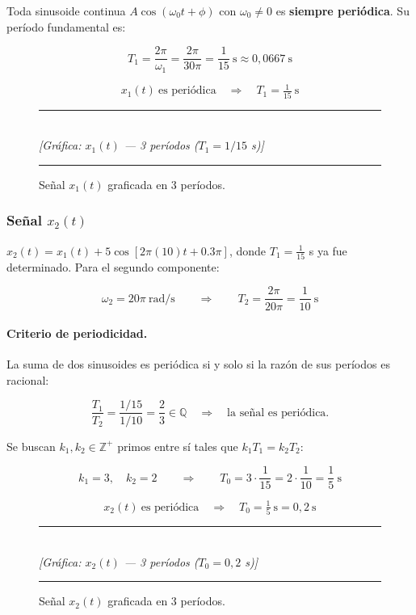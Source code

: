 \documentclass[../Main_Include.tex]{subfiles}
\begin{document}
Toda sinusoide continua $A\cos(\omega_0 t + \phi)$ con $\omega_0 \neq 0$
es \textbf{siempre periódica}. Su período fundamental es:

\[
    T_1 = \frac{2\pi}{\omega_1} = \frac{2\pi}{30\pi} = \frac{1}{15}\ \text{s}
    \approx 0{,}0667\ \text{s}
\]

\[
    \boxed{x_1(t)\ \text{es periódica} \quad \Rightarrow \quad T_1 = \tfrac{1}{15}\ \text{s}}
\]

\begin{figure}[H]
    \centering
    \rule{\linewidth}{0.4pt}\\[4pt]
    {\small\itshape [Gráfica: $x_1(t)$ — 3 períodos ($T_1 = 1/15$ s)]}\\[4pt]
    \rule{\linewidth}{0.4pt}
    \caption{Señal $x_1(t)$ graficada en 3 períodos.}
\end{figure}

\subsubsection*{Señal \boldmath$x_2(t)$}

$x_2(t) = x_1(t) + 5\cos[2\pi(10)t + 0.3\pi]$, donde $T_1 = \tfrac{1}{15}$ s
ya fue determinado. Para el segundo componente:

\[
    \omega_2 = 20\pi\ \text{rad/s}
    \qquad\Rightarrow\qquad
    T_2 = \frac{2\pi}{20\pi} = \frac{1}{10}\ \text{s}
\]

\paragraph{Criterio de periodicidad.}
La suma de dos sinusoides es periódica si y solo si la razón de sus períodos
es racional:

\[
    \frac{T_1}{T_2} = \frac{1/15}{1/10} = \frac{2}{3} \in \mathbb{Q}
    \quad\Longrightarrow\quad \text{la señal es periódica.}
\]

Se buscan $k_1, k_2 \in \mathbb{Z}^+$ primos entre sí tales que
$k_1 T_1 = k_2 T_2$:

\[
    k_1 = 3,\quad k_2 = 2
    \qquad\Rightarrow\qquad
    T_0 = 3 \cdot \frac{1}{15} = 2 \cdot \frac{1}{10} = \frac{1}{5}\ \text{s}
\]

\[
    \boxed{x_2(t)\ \text{es periódica} \quad \Rightarrow \quad T_0 = \tfrac{1}{5}\ \text{s} = 0{,}2\ \text{s}}
\]

\begin{figure}[H]
    \centering
    \rule{\linewidth}{0.4pt}\\[4pt]
    {\small\itshape [Gráfica: $x_2(t)$ — 3 períodos ($T_0 = 0{,}2$ s)]}\\[4pt]
    \rule{\linewidth}{0.4pt}
    \caption{Señal $x_2(t)$ graficada en 3 períodos.}
\end{figure}
\end{document}

